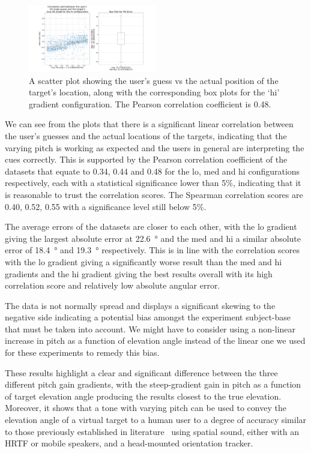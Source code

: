 \documentclass[format=sigconf, review=true, screen=true, anonymous=true]{acmart}
\begin{document}
\begin{figure}
  \centering
  \includegraphics[width=0.5\textwidth]{figures/tilt_err_hi.png}
  \caption{A scatter plot showing the user's guess vs the actual position of the target's location, along with the corresponding box plots for the `hi' gradient configuration. The Pearson correlation coefficient is 0.48. }
  \label{fig:tilt-err-hi}
\end{figure}

We can see from the plots that there is a significant linear correlation between the user's guesses and the actual locations of the targets, indicating that the varying pitch is working as expected and the users in general are interpreting the cues correctly. This is supported by the Pearson correlation coefficient of the datasets that equate to 0.34, 0.44 and 0.48 for the lo, med and hi configurations respectively, each with a statistical significance lower than 5\%, indicating that it is reasonable to trust the correlation scores. The Spearman correlation scores are 0.40, 0.52, 0.55 with a significance level still below 5\%. 

The average errors of the datasets are closer to each other, with the lo gradient giving the largest absolute error at \SI{22.6}{\degree} and the med and hi a similar absolute error of \SI{18.4}{\degree} and \SI{19.3}{\degree} respectively. This is in line with the correlation scores with the lo gradient giving a significantly worse result than the med and hi gradients and the hi gradient giving the best results overall with its high correlation score and relatively low absolute angular error. 

The data is not normally spread and displays a significant skewing to the negative side indicating a potential bias amongst the experiment subject-base that must be taken into account. We might have to consider using a non-linear increase in pitch as a function of elevation angle instead of the linear one we used for these experiments to remedy this bias.

These results highlight a clear and significant difference between the three different pitch gain gradients, with the steep-gradient gain in pitch as a function of target elevation angle producing the results closest to the true elevation. Moreover, it shows that a tone with varying pitch can be used to convey the elevation angle of a virtual target to a human user to a degree of accuracy similar to those previously established in literature~\cite{bujacz2011sonification, katz2011spatial, zotkin2004rendering} using spatial sound, either with an HRTF or mobile speakers, and a head-mounted orientation tracker.  
\end{document}

